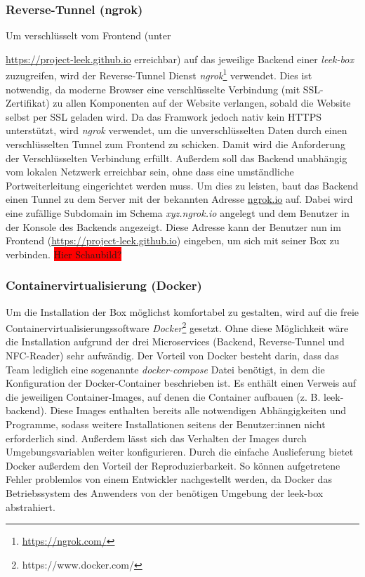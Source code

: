 \documentclass[10pt, a4paper]{article}
\begin{document}
\subsubsection{Reverse-Tunnel (ngrok)}
Um verschlüsselt vom Frontend (unter \raggedright\url{https://project-leek.github.io} erreichbar) auf das jeweilige Backend einer \textit{leek-box} zuzugreifen, wird der Reverse-Tunnel Dienst \textit{ngrok}\footnote{\raggedright\url{https://ngrok.com/}} verwendet.
Dies ist notwendig, da moderne Browser eine verschlüsselte Verbindung (mit SSL-Zertifikat) zu allen Komponenten auf der Website verlangen, sobald die Website selbst per SSL geladen wird.
Da das Framwork jedoch nativ kein HTTPS unterstützt, wird \textit{ngrok} verwendet, um die unverschlüsselten Daten durch einen verschlüsselten Tunnel zum Frontend zu schicken. Damit wird die Anforderung der Verschlüsselten Verbindung erfüllt.
Außerdem soll das Backend unabhängig vom lokalen Netzwerk erreichbar sein, ohne dass eine umständliche Portweiterleitung eingerichtet werden muss. Um dies zu leisten, baut das Backend einen Tunnel zu dem Server mit der bekannten Adresse \url{ngrok.io} auf.
Dabei wird eine zufällige Subdomain im Schema \textit{xyz.ngrok.io} angelegt und dem Benutzer in der Konsole des Backends angezeigt. Diese Adresse kann der Benutzer nun im Frontend (\url{https://project-leek.github.io}) eingeben, um sich mit seiner Box zu verbinden.
\colorbox{red}{Hier Schaubild?}


\subsubsection{Containervirtualisierung (Docker)}
Um die Installation der Box möglichst komfortabel zu gestalten, wird auf die freie Containervirtualisierungssoftware \textit{Docker}\footnote{https://www.docker.com/} gesetzt.
Ohne diese Möglichkeit wäre die Installation aufgrund der drei Microservices (Backend, Reverse-Tunnel und NFC-Reader) sehr aufwändig.
Der Vorteil von Docker besteht darin, dass das Team lediglich eine sogenannte \textit{docker-compose} Datei benötigt, in dem die Konfiguration der Docker-Container beschrieben ist.
Es enthält einen Verweis auf die jeweiligen Container-Images, auf denen die Container aufbauen (z. B. leek-backend). Diese Images enthalten bereits alle notwendigen Abhängigkeiten und Programme,
sodass weitere Installationen seitens der Benutzer:innen nicht erforderlich sind.
Außerdem lässt sich das Verhalten der Images durch Umgebungsvariablen weiter konfigurieren. Durch die einfache Auslieferung bietet Docker außerdem den Vorteil der Reproduzierbarkeit.
So können aufgetretene Fehler problemlos von einem Entwickler nachgestellt werden, da Docker das Betriebssystem des Anwenders von der benötigen Umgebung der leek-box abstrahiert.
\end{document}
